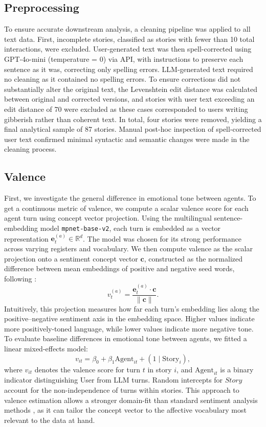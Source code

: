 \documentclass[11pt]{article}
\begin{document}
\subsection{Preprocessing}
To ensure accurate downstream analysis, a cleaning pipeline was applied to all text data. First, incomplete stories, classified as stories with fewer than 10 total interactions, were excluded. User-generated text was then spell-corrected using GPT-4o-mini (temperature = 0) via API, with instructions to preserve each sentence as it was, correcting only spelling errors. LLM-generated text required no cleaning as it contained no spelling errors. To ensure corrections did not substantially alter the original text, the Levenshtein edit distance was calculated between original and corrected versions, and stories with user text exceeding an edit distance of 70 were excluded as these cases corresponded to users writing gibberish rather than coherent text. In total, four stories were removed, yielding a final analytical sample of 87 stories. Manual post-hoc inspection of spell-corrected user text confirmed minimal syntactic and semantic changes were made in the cleaning process.

\subsection{Valence}
First, we investigate the general difference in emotional tone between agents. To get a continuous metric of valence, we compute a scalar valence score for each agent turn using concept vector projection. Using the multilingual sentence-embedding model \texttt{mpnet-base-v2}, each turn is embedded as a vector representation $\mathbf{e}_{t}^{(a)} \in \mathbb{R}^d$. The model was chosen for its strong performance across varying registers and vocabulary.
We then compute valence as the scalar projection onto a sentiment concept vector $\mathbf{c}$, constructed as the normalized difference between mean embeddings of positive and negative seed words, following \citet{lyngbaek2025continuous}:
\begin{equation}
v_{t}^{(a)} = \frac{\mathbf{e}_{t}^{(a)} \cdot \mathbf{c}}{\|\mathbf{c}\|}.
\end{equation}
Intuitively, this projection measures how far each turn's embedding lies along the positive--negative sentiment axis in the embedding space. Higher values indicate more positively-toned language, while lower values indicate more negative tone. To evaluate baseline differences in emotional tone between agents, we fitted a linear mixed-effects model:
\begin{equation}
v_{it} = \beta_0 + \beta_1 \mathrm{Agent}_{it} + (1 \mid \mathrm{Story}_i),
\end{equation}
where $v_{it}$ denotes the valence score for turn $t$ in story $i$, and $\mathrm{Agent}_{it}$ is a binary indicator distinguishing User from LLM turns. Random intercepts for $Story$ account for the non-independence of turns within stories. This approach to valence estimation allows a stronger domain-fit than standard sentiment analysis methods \cite{lyngbaek2025continuous}, as it can tailor the concept vector to the affective vocabulary most relevant to the data at hand.
\end{document}
